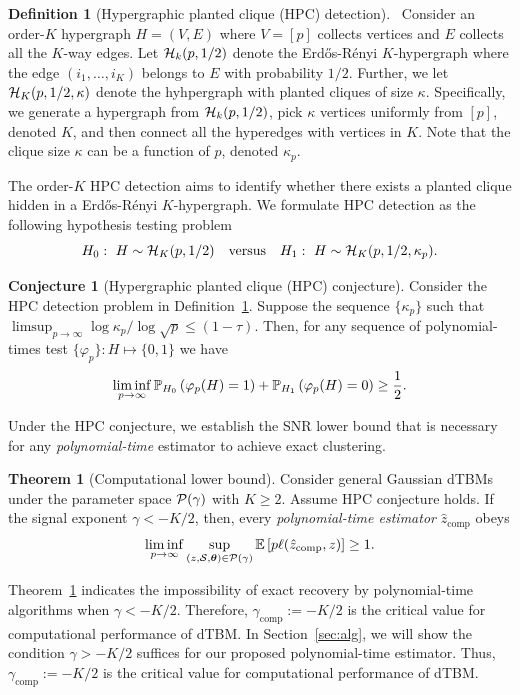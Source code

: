 \documentclass[lettersize,journal]{IEEEtran}
\theoremstyle{definition}
\newtheorem{thm}{Theorem}
\theoremstyle{definition}
\newtheorem{defn}{Definition}
\newtheorem{conjecture}{Conjecture}
\newcommand{\of}[1]{\left(#1\right)}
\begin{document}
\begin{defn}[Hypergraphic planted clique (HPC) detection]~\label{def:HPC} Consider an order-$K$ hypergraph $H = (V,E)$ where $V = [p]$ collects vertices and $E$ collects all the $K$-way edges. Let $\mathcal{H}_k(p, 1/2)$ denote the Erd\H{o}s-R\'{e}nyi $K$-hypergraph where the edge $(i_1,\ldots, i_K)$ belongs to $E$ with probability $1/2$. Further, we let $\mathcal{H}_K(p, 1/2, \kappa)$ denote the hyhpergraph with planted cliques of size $\kappa$. Specifically, we generate a hypergraph from $\mathcal{H}_k(p, 1/2)$, pick $\kappa$ vertices uniformly from $[p]$, denoted $K$, and then connect all the hyperedges with vertices in $K$. Note that the clique size $\kappa$ can be a function of $p$, denoted $\kappa_p$. 

The order-$K$ HPC detection aims to identify whether there exists a planted clique hidden in a Erd\H{o}s-R\'{e}nyi $K$-hypergraph. We formulate HPC detection as the following hypothesis testing problem
\begin{equation}
    H_0:\ H \sim \mathcal{H}_K(p,1/2) \quad \text{versus} \quad H_1: \ H \sim \mathcal{H}_K(p,1/2, \kappa_p).
\end{equation}
\end{defn}

\begin{conjecture}[Hypergraphic planted clique (HPC) conjecture]\label{hypo:HPC} Consider the HPC detection problem in Definition~\ref{def:HPC}. Suppose the sequence $\{\kappa_p\}$ such that $\limsup_{p \rightarrow \infty} \log \kappa_p/ \log \sqrt{p} \leq (1 - \tau)$. Then, for any sequence of polynomial-times test $\{ \varphi_p\}: H \mapsto \{0,1\}$ we have 
\begin{equation}
    \liminf_{p \rightarrow \infty} \bbP_{H_0} \of{ \varphi_p(H) =1 } +  \bbP_{H_1} \of{ \varphi_p(H) =0} \geq \frac{1}{2}.
\end{equation}
\end{conjecture}

Under the HPC conjecture, we establish the SNR lower bound that is necessary for any \emph{polynomial-time} estimator to achieve exact clustering.

\begin{thm}[Computational lower bound]\label{thm:comp} Consider general Gaussian dTBMs under the parameter space $\mathcal{P}(\gamma)$ with $K\geq 2$. Assume HPC conjecture holds. If the signal exponent $\gamma < -K/2$, then, every \emph{polynomial-time estimator} $\hat z_{\text{comp}}$ obeys
\begin{align}
   \liminf_{p\to \infty}\sup_{(z, \mathcal{S}, \boldsymbol{\theta}) \in \mathcal{P}(\gamma)}  \mathbb{E} \left[ p\ell(\hat z_{\text{comp}}, z) \right]\geq 1.
\end{align}
\end{thm}
Theorem~\ref{thm:comp} indicates the impossibility of exact recovery by polynomial-time algorithms when $\gamma < -K/2$.  Therefore, $\gamma_{\text{comp}}:=-K/2$ is the critical value for computational performance of dTBM.  In Section~\ref{sec:alg}, we will show the condition $\gamma> -K/2$ suffices for our proposed polynomial-time estimator. Thus, $\gamma_{\text{comp}}:=-K/2$ is the critical value for computational performance of dTBM.  
\end{document}
